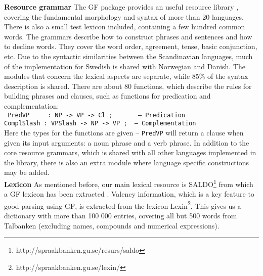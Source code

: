 \documentclass[runningheads,a4paper]{llncs}
\begin{document}
\textbf{Resource grammar}
The GF package provides an useful resource library \cite{gf-resource}, covering the
fundamental morphology and syntax of more than 20 languages.
There is also a small test lexicon included, containing a few hundred common
words.
The grammars describe how to construct phrases and sentences and how to
decline words. They cover the 
word order, agreement, tense, basic conjunction, etc.
Due to the syntactic similarities between the Scandinavian languages, much of
the implementation for Swedish is shared with Norwegian and Danish. The modules
that concern the lexical aspects are separate, while 85\% of the syntax
description is shared.  There are about 80 functions, which describe the rules
for building phrases and clauses, such as functions for predication and
complementation:\\
\small \texttt{
\indent PredVP ~~~ : NP -> VP -> Cl ;~~~~~~ -- Predication\\
\indent ComplSlash : VPSlash  -> NP -> VP ;~ -- Complementation}\\
\normalsize
Here the types for the functions are given -- \texttt{PredVP} will return a clause when 
given its input arguments: a noun phrase and a verb phrase.
In addition to the core resource grammars, which is shared with all other
languages implemented in the library, there is also an extra module
where language specific constructions may be added.\\

\textbf{Lexicon}
As mentioned before, our main lexical resource is SALDO\footnote{http://spraakbanken.gu.se/resurs/saldo}
from which a GF lexicon has been extracted \cite{ahlbergEnache}.
Valency information, which is a key feature to good parsing using GF,
is extracted from the lexicon
Lexin\footnote{http://spraakbanken.gu.se/lexin/}.
This gives us a dictionary with more than 100 000 entries, covering all but 500
words from Talbanken (excluding names, compounds and numerical expressions).
\end{document}
